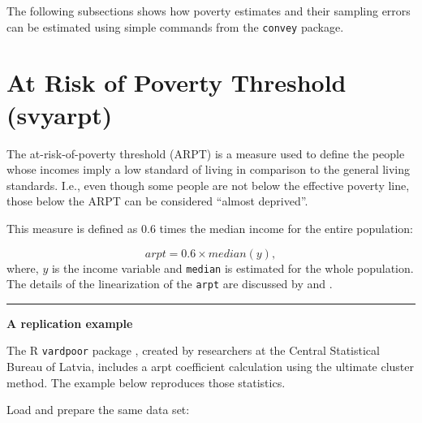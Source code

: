 \documentclass[
]{book}
\begin{document}
The following subsections shows how poverty estimates and their sampling errors can be estimated using simple commands from the \texttt{convey} package.

\hypertarget{at-risk-of-poverty-threshold-svyarpt}{%
\section{At Risk of Poverty Threshold (svyarpt)}\label{at-risk-of-poverty-threshold-svyarpt}}

The at-risk-of-poverty threshold (ARPT) is a measure used to define the people whose incomes imply a low standard of living in comparison to the general living standards. I.e., even though some people are not below the effective poverty line, those below the ARPT can be considered ``almost deprived''.

This measure is defined as \(0.6\) times the median income for the entire population:

\[
arpt = 0.6 \times median(y),
\]
where, \(y\) is the income variable and \texttt{median} is estimated for the whole population. The details of the linearization of the \texttt{arpt} are discussed by \textcite{deville1999} and \textcite{osier2009}.

\begin{center}\rule{0.5\linewidth}{0.5pt}\end{center}

\textbf{A replication example}

The R \texttt{vardpoor} package \autocite{vardpoor}, created by researchers at the Central Statistical Bureau of Latvia, includes a arpt coefficient calculation using the ultimate cluster method. The example below reproduces those statistics.

Load and prepare the same data set:
\end{document}
